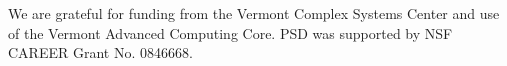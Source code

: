 We are grateful for funding from the Vermont Complex Systems Center
and use of the Vermont Advanced Computing Core.
PSD was supported by NSF CAREER Grant No. 0846668.

